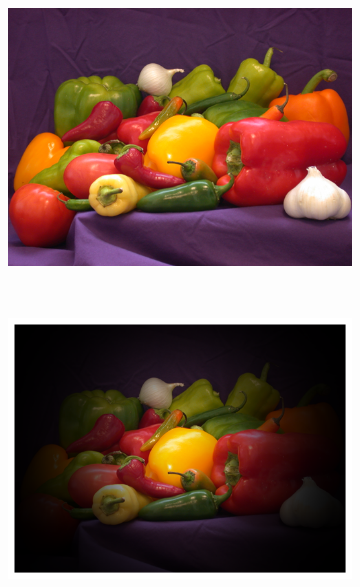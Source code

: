 \begin{figure}[!t]
        \centering
        \begin{subfigure}[b]{0.5\textwidth}
                \centerline{\includegraphics[scale = 0.4]{./images/peppers.png}}
        \end{subfigure}%
		~
        \centering
        \begin{subfigure}[b]{0.5\textwidth}
                \centerline{\includegraphics[scale = 0.4]{./images/peppers1.png}}
        \end{subfigure}%



\end{figure}
